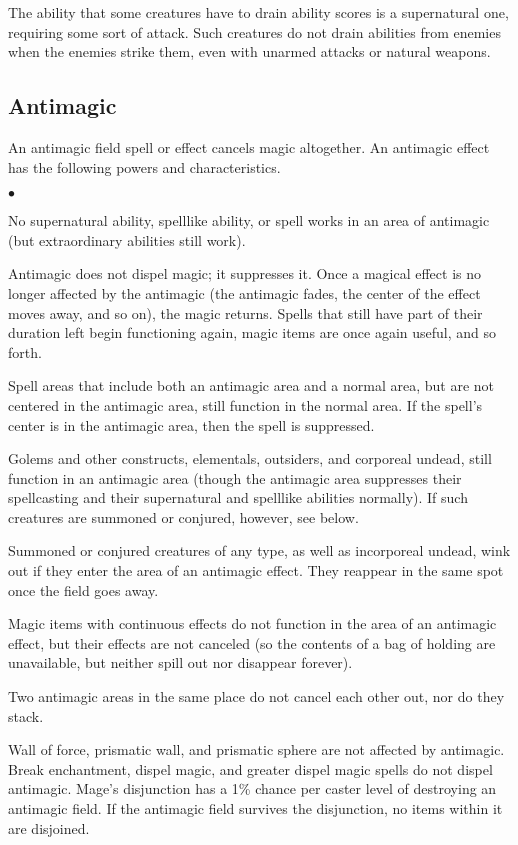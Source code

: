 The ability that some creatures have to drain ability scores is a supernatural one, requiring some sort of attack. Such creatures do not drain abilities from enemies when the enemies strike them, even with unarmed attacks or natural weapons.

\subsection{Antimagic}

An antimagic field spell or effect cancels magic altogether. An antimagic effect has the following powers and characteristics.

\begin{list}{$\bullet$}{\itemspace}
	\item No supernatural ability, spell\textendash like ability, or spell works in an area of antimagic (but extraordinary abilities still work).
	\item Antimagic does not dispel magic; it suppresses it. Once a magical effect is no longer affected by the antimagic (the antimagic fades, the center of the effect moves away, and so on), the magic returns. Spells that still have part of their duration left begin functioning again, magic items are once again useful, and so forth.
	\item Spell areas that include both an antimagic area and a normal area, but are not centered in the antimagic area, still function in the normal area. If the spell's center is in the antimagic area, then the spell is suppressed.
	\item Golems and other constructs, elementals, outsiders, and corporeal undead, still function in an antimagic area (though the antimagic area suppresses their spellcasting and their supernatural and spell\textendash like abilities normally). If such creatures are summoned or conjured, however, see below. 
	\item Summoned or conjured creatures of any type, as well as incorporeal undead, wink out if they enter the area of an antimagic effect. They reappear in the same spot once the field goes away.
	\item Magic items with continuous effects do not function in the area of an antimagic effect, but their effects are not canceled (so the contents of a bag of holding are unavailable, but neither spill out nor disappear forever).
	\item Two antimagic areas in the same place do not cancel each other out, nor do they stack.
	\item Wall of force, prismatic wall, and prismatic sphere are not affected by antimagic. Break enchantment, dispel magic, and greater dispel magic spells do not dispel antimagic. Mage's disjunction has a 1\% chance per caster level of destroying an antimagic field. If the antimagic field survives the disjunction, no items within it are disjoined.
\end{list}

